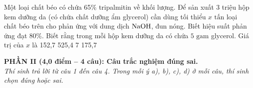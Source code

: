 \documentclass[12pt,a4paper]{article}
\begin{document}
\begin{ex}
Một loại chất béo có chứa 65\% tripalmitin về khối lượng. Để sản xuất 3 triệu hộp kem dưỡng da (có chứa chất dưỡng ẩm glycerol) cần dùng tối thiểu $x\text{ tấn}$ loại chất béo trên cho phản ứng với dung dịch $\ce{NaOH}$, đun nóng. Biết hiệu suất phản ứng đạt 80\%. Biết rằng trong mỗi hộp kem dưỡng da có chứa $5\text{ gam}$ glycerol. Giá trị của $x$ là
\choice
{152{,}7}
{525{,}4}
{7}
{175{,}7}
\end{ex}


\vspace{0.3cm}
\noindent
\textbf{PHẦN II (4,0 điểm -- 4 câu): Câu trắc nghiệm đúng sai.}\\
\textit{Thí sinh trả lời từ câu 1 đến câu 4. Trong mỗi ý a), b), c), d) ở mỗi câu, thí sinh chọn đúng hoặc sai.}

\setcounter{ex}{0}
\end{document}
